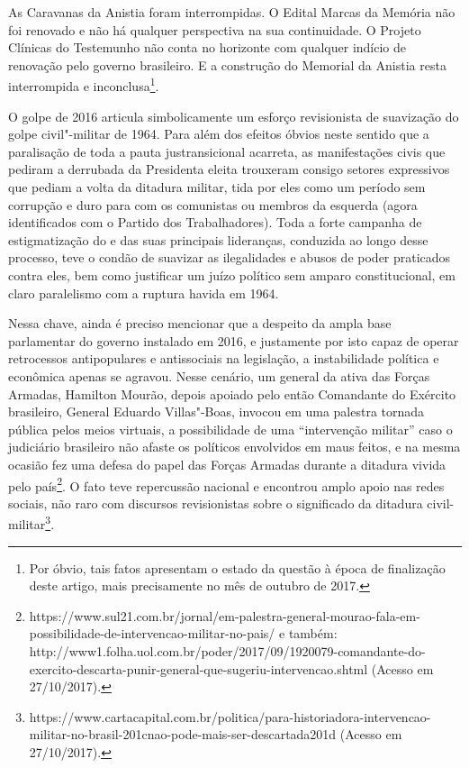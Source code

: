 As Caravanas da Anistia foram interrompidas. O Edital Marcas da Memória
não foi renovado e não há qualquer perspectiva na sua continuidade. O
Projeto Clínicas do Testemunho não conta no horizonte com qualquer
indício de renovação pelo governo brasileiro. E a construção do Memorial
da Anistia resta interrompida e inconclusa\footnote{Por óbvio, tais
  fatos apresentam o estado da questão à época de finalização deste
  artigo, mais precisamente no mês de outubro de 2017.}.

O golpe de 2016 articula simbolicamente um esforço revisionista de
suavização do golpe civil"-militar de 1964. Para além dos efeitos óbvios
neste sentido que a paralisação de toda a pauta justransicional
acarreta, as manifestações civis que pediram a derrubada da Presidenta
eleita trouxeram consigo setores expressivos que pediam a volta da
ditadura militar, tida por eles como um período sem corrupção e duro
para com os comunistas ou membros da esquerda (agora identificados com o
Partido dos Trabalhadores). Toda a forte campanha de estigmatização do
 e das suas principais lideranças, conduzida ao longo desse processo,
teve o condão de suavizar as ilegalidades e abusos de poder praticados
contra eles, bem como justificar um juízo político sem amparo
constitucional, em claro paralelismo com a ruptura havida em 1964.

Nessa chave, ainda é preciso mencionar que a despeito da ampla base
parlamentar do governo instalado em 2016, e justamente por isto capaz de
operar retrocessos antipopulares e antissociais na legislação, a
instabilidade política e econômica apenas se agravou. Nesse cenário, um
general da ativa das Forças Armadas, Hamilton Mourão, depois apoiado
pelo então Comandante do Exército brasileiro, General Eduardo
Villas"-Boas, invocou em uma palestra tornada pública pelos meios
virtuais, a possibilidade de uma ``intervenção militar'' caso o judiciário
brasileiro não afaste os políticos envolvidos em maus feitos, e na mesma
ocasião fez uma defesa do papel das Forças Armadas durante a ditadura
vivida pelo país\footnote{https://www.sul21.com.br/jornal/em-palestra-general-mourao-fala-em-possibilidade-de-intervencao-militar-no-pais/
  e também:
  http://www1.folha.uol.com.br/poder/2017/09/1920079-comandante-do-exercito-descarta-punir-general-que-sugeriu-intervencao.shtml
  (Acesso em 27/10/2017).}. O fato teve repercussão nacional e encontrou
amplo apoio nas redes sociais, não raro com discursos revisionistas
sobre o significado da ditadura civil-militar\footnote{https://www.cartacapital.com.br/politica/para-historiadora-intervencao-militar-no-brasil-201cnao-pode-mais-ser-descartada201d
  (Acesso em 27/10/2017).}.

